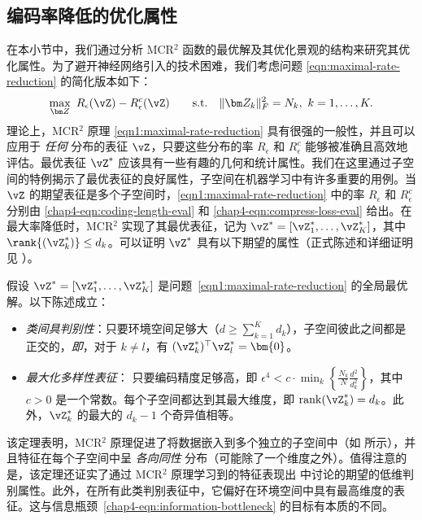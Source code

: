 \documentclass[../../book-main_zh.tex]{subfiles}
\begin{document}
\vspace{-0.1in}

\subsection{编码率降低的优化属性}
\label{sec:MCR-landscape}

在本小节中，我们通过分析 MCR$^2$ 函数的最优解及其优化景观的结构来研究其优化属性。为了避开神经网络引入的技术困难，我们考虑问题 \eqref{eqn:maximal-rate-reduction} 的简化版本如下：
\begin{align}\label{eqn1:maximal-rate-reduction}
    \max_{\bm Z}\ R_{\epsilon}(\vZ) - R_{\epsilon}^c(\vZ)\qquad
    \mathrm{s.t.}\quad \|\bm Z_k\|_F^2 = N_k,\ k =1,\dots,K.
\end{align}
理论上，MCR$^2$ 原理 \eqref{eqn1:maximal-rate-reduction} 具有很强的一般性，并且可以应用于 {\em 任何} 分布的表征 $\vZ$，只要这些分布的率 $R_\epsilon$ 和 $R^c_\epsilon$ 能够被准确且高效地评估。最优表征 $\vZ^{\ast}$ 应该具有一些有趣的几何和统计属性。我们在这里通过子空间的特例揭示了最优表征的良好属性，子空间在机器学习中有许多重要的用例。当 $\vZ$ 的期望表征是多个子空间时，\eqref{eqn1:maximal-rate-reduction} 中的率 $R_\epsilon$ 和 $R^c_\epsilon$ 分别由 \eqref{chap4-eqn:coding-length-eval} 和 \eqref{chap4-eqn:compress-loss-eval} 给出。在最大率降低时，MCR$^2$ 实现了其最优表征，记为 $\vZ^{\ast} = [\vZ_1^*,\dots,\vZ_K^*]$，其中 $\rank{(\vZ_{k}^*)}\le d_k$。可以证明 $\vZ^{\ast}$ 具有以下期望的属性（正式陈述和详细证明见 \cite{yu2020learning}）。

\begin{theorem}[\bf 全局最优解的刻画]
    假设 $\vZ^{\ast} = [\vZ_1^*,\dots,\vZ_K^*]$ 是问题~\eqref{eqn1:maximal-rate-reduction} 的全局最优解。以下陈述成立：
    \begin{itemize}
        \item {\em 类间具判别性}：只要环境空间足够大（$d \ge \sum_{k=1}^{K} d_k$），子空间彼此之间都是正交的，{\em 即}，对于 $k \not= l$，有 $(\vZ_{k}^*)^{\top} \vZ_{l}^* = \bm{0}$。
        \item {\em 最大化多样性表征}：
            只要编码精度足够高，即 $\epsilon ^4 < c\cdot \min_{k}\left\{ \frac{N_k}{N}\frac{d^2}{d_k^2}\right\}$，其中 $c>0$ 是一个常数。每个子空间都达到其最大维度，即 $\mathrm{rank}{(\vZ_{k}^*)}= d_k$。此外，$\vZ_{k}^*$ 的最大的 $d_k-1$ 个奇异值相等。
            \label{thm:MCR2-properties}
    \end{itemize}
\end{theorem}

该定理表明，MCR$^2$ 原理促进了将数据嵌入到多个独立的子空间中（如  所示），并且特征在每个子空间中呈 {\em 各向同性} 分布（可能除了一个维度之外）。值得注意的是，该定理还证实了通过 MCR$^2$ 原理学习到的特征表现出  中讨论的期望的低维判别属性。此外，在所有此类判别表征中，它偏好在环境空间中具有最高维度的表征。这与信息瓶颈~\eqref{chap4-eqn:information-bottleneck} 的目标有本质的不同。
\end{document}
